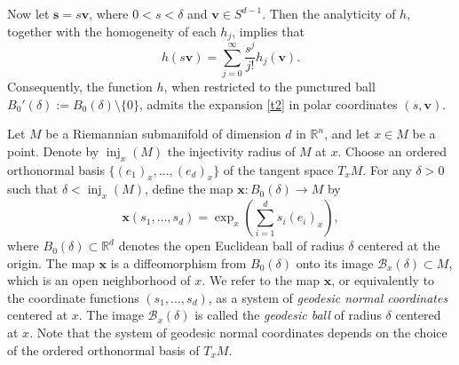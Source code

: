 \documentclass{amsart}
\theoremstyle{Theorem}
\theoremstyle{remark}
\numberwithin{equation}{section} \numberwithin{figure}{section}
\renewcommand*{\to}{\rightarrow}
\begin{document}
Now let \( \mathbf{s} = s \mathbf{v} \), where \( 0 < s < \delta \) and \( \mathbf{v} \in S^{d-1} \). Then the analyticity of \( h \), together with the homogeneity of each \( h_j \), implies that
\begin{equation}\label{t2}
h(s \mathbf{v}) = \sum_{j=0}^{\infty} \frac{s^j}{j!} h_j(\mathbf{v}).
\end{equation}
Consequently, the function \( h \), when restricted to the punctured ball \( B_0'(\delta) := B_0(\delta) \setminus \{0\} \), admits the expansion \eqref{t2} in polar coordinates \( (s, \mathbf{v}) \).




Let \( M \) be a Riemannian submanifold of dimension \( d \) in \( \mathbb{R}^n \), and let \( x \in M \) be a point. Denote by \( \operatorname{inj}_x(M) \) the injectivity radius of \( M \) at \( x \).
Choose an ordered orthonormal basis \( \{ (e_1)_x, \dots, (e_d)_x \} \) of the tangent space \( T_x M \). For any \( \delta > 0 \) such that \( \delta < \operatorname{inj}_x(M) \), define the map
\(
\mathbf{x} : B_0(\delta) \to M
\)
by
\[
\mathbf{x}(s_1, \dots, s_d) = \exp_x\left( \sum_{i=1}^d s_i (e_i)_x \right),
\]
where \( B_0(\delta) \subset \mathbb{R}^d \) denotes the open Euclidean ball of radius \( \delta \) centered at the origin.
The map \( \mathbf{x} \) is a diffeomorphism from \( B_0(\delta) \) onto its image \( \mathcal{B}_x(\delta) \subset M \), which is an open neighborhood of \( x \). We refer to the map \( \mathbf{x} \), or equivalently to the coordinate functions \( (s_1, \dots, s_d) \), as a system of \emph{geodesic normal coordinates} centered at \( x \). The image \( \mathcal{B}_x(\delta) \) is called the \emph{geodesic ball} of radius \( \delta \) centered at \( x \).
Note that the system of geodesic normal coordinates depends on the choice of the ordered orthonormal basis of \( T_x M \).
\end{document}

